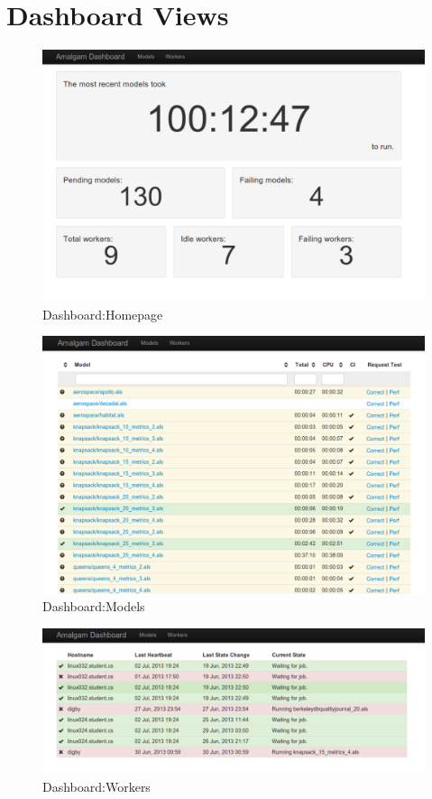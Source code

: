 \section{Dashboard Views}\label{app:dashboard}
\begin{figure}[H] 
	\caption{Dashboard:Homepage}\label{fig:dashboard_home}
	\includegraphics[width=\textwidth]{images/dashboard_home}
\end{figure}

\begin{figure}[H] 
	\caption{Dashboard:Models}\label{fig:dashboard_models}
	\includegraphics[width=\textwidth]{images/dashboard_models}
\end{figure}

\begin{figure}[H] 
	\caption{Dashboard:Workers}\label{fig:dashboard_workers}
	\includegraphics[width=\textwidth]{images/dashboard_workers}
\end{figure}
